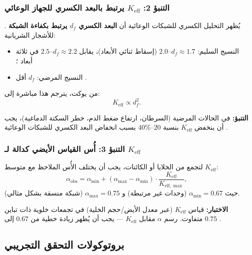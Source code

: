 \documentclass[11pt,a4paper]{article}
\newcommand{\Keff}{K_{\mathrm{eff}}}
\begin{document}
	\subsubsection{التنبؤ 2: \(\Keff\) يرتبط بالبعد الكسري للجهاز الوعائي}
	
	يُظهر التحليل الكسري للشبكات الوعائية أن \textbf{البعد الكسري \(d_f\) يرتبط بكفاءة الشبكة} \cite{Gould1993}. للأشجار الشريانية:
	\begin{itemize}
		\item النسيج السليم: \(d_f \approx 1.7\)–\(2.0\) (إسقاط ثنائي الأبعاد)، يقابل \(d_f \approx 2.2\)–\(2.5\) في ثلاثة أبعاد \cite{Cross1993}؛
		\item النسيج المرضي: \(d_f\) أقل \cite{Gould1993}.
	\end{itemize}
	من يوكت، يترجم هذا مباشرة إلى:
	\begin{equation}
		\Keff \propto d_f^{2}.
	\end{equation}
	
	\textbf{التنبؤ:} في الحالات المرضية (السرطان، ارتفاع ضغط الدم، خطر السكتة الدماغية)، يجب أن ينخفض \(\Keff\) بنسبة \(20\)–\(40\%\) بسبب انخفاض البعد الكسري للشبكات الوعائية \cite{Gould1993}.
	
	\subsubsection{التنبؤ 3: أُس القياس الأيضي كدالة لـ \(\Keff\)}
	
	لتجمع من الخلايا أو الكائنات، يجب أن يختلف الأُس الملاحظ مع متوسط \(\Keff\):
	\begin{equation}
		\alpha_{\text{obs}} = \alpha_{\min} + (\alpha_{\max} - \alpha_{\min}) \cdot \frac{\Keff}{K_{\mathrm{eff},\max}},
		\label{eq:scaling-exponent}
	\end{equation}
	حيث \(\alpha_{\min} = 0.67\) (وحدات غير مرتبطة) و \(\alpha_{\max} = 0.75\) (شبكة منسقة بشكل مثالي).
	
	\textbf{الاختبار:} قياس \(\Keff\) (عبر معدل الأيض/حجم الخلية) في تجمعات خلوية ذات تباين متفاوت. رسم \(\alpha\) مقابل \(\Keff\) — يجب أن يُظهر زيادة خطية من \(0.67\) إلى \(0.75\) \cite{Takemoto2015}.
	
	\subsection{بروتوكولات التحقق التجريبي}
	
\end{document}
